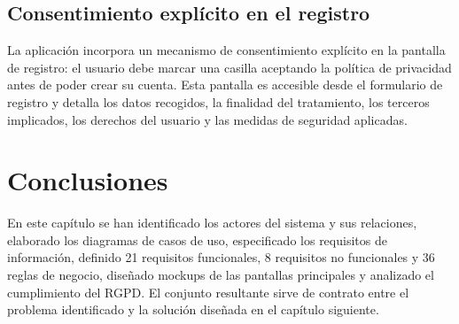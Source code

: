 \subsection{Consentimiento explícito en el registro}

La aplicación incorpora un mecanismo de consentimiento explícito en la pantalla de registro: el usuario debe marcar una casilla aceptando la política de privacidad antes de poder crear su cuenta. Esta pantalla es accesible desde el formulario de registro y detalla los datos recogidos, la finalidad del tratamiento, los terceros implicados, los derechos del usuario y las medidas de seguridad aplicadas.

\section{Conclusiones}

En este capítulo se han identificado los actores del sistema y sus relaciones, elaborado los diagramas de casos de uso, especificado los requisitos de información, definido 21 requisitos funcionales, 8 requisitos no funcionales y 36 reglas de negocio, diseñado mockups de las pantallas principales y analizado el cumplimiento del RGPD. El conjunto resultante sirve de contrato entre el problema identificado y la solución diseñada en el capítulo siguiente.
